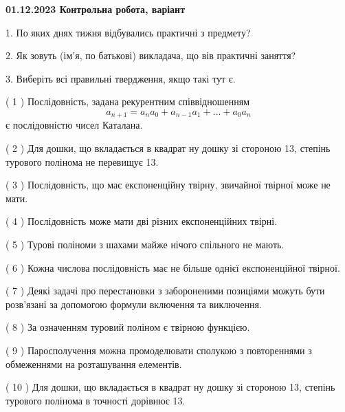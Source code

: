 \documentclass[12pt, ukrainian]{article}
\begin{document}
\vspace{4mm}
\newpage
\begin {large}

\textbf{01.12.2023 Контрольна робота, варіант  }\par


{
1. По яких днях тижня відбувались практичні з предмету?



\vspace{5mm}
2. Як зовуть (ім'я, по батькові) викладача, що вів практичні заняття?



\vspace{5mm}
3. Виберіть всі правильні твердження, якщо такі тут є.\par
\vspace{2mm}
( 1 ) Послідовність, задана рекурентним співвідношенням $$a_{n+1}=a_{n}a_{0}+a_{n-1}a_{1}+\ldots+a_0a_{n}$$ є послідовністю чисел Каталана.%

( 2 ) Для дошки, що вкладається в квадрат ну дошку зі стороною 13, степінь турового полінома не перевищує 13.%

( 3 ) Послідовність, що має експоненційну твірну, звичайної твірної може не мати.%

( 4 ) Послідовність може мати дві різних експоненційних твірні.%

( 5 ) Турові поліноми з шахами майже нічого спільного не мають.%

( 6 ) Кожна числова послідовність має не більше однієї  експоненційної твірної.%

( 7 ) Деякі задачі про перестановки з забороненими позиціями можуть бути розв’я\-за\-ні за допомогою формули включення та виключення.%

( 8 ) За означенням туровий поліном є твірною функцією.%

( 9 ) Паросполучення можна промоделювати сполукою з повтореннями з обмеженнями на розташування елементів.%

( 10 ) Для дошки, що вкладається в квадрат ну дошку зі стороною 13, степінь турового полінома в точності дорівнює 13.%
}
\end {large}
\end{document}
